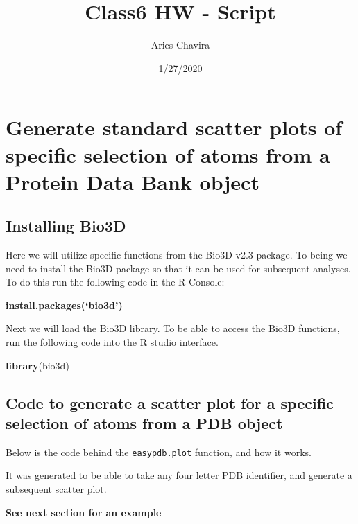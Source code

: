 \documentclass[]{article}
\title{Class6 HW - Script}
\author{Aries Chavira}
\date{1/27/2020}
\newenvironment{Shaded}{\begin{snugshade}}{\end{snugshade}}
\newcommand{\KeywordTok}[1]{\textcolor[rgb]{0.13,0.29,0.53}{\textbf{#1}}}
\newcommand{\NormalTok}[1]{#1}
\begin{document}
\maketitle

\section{Generate standard scatter plots of specific selection of atoms
from a Protein Data Bank
object}\label{generate-standard-scatter-plots-of-specific-selection-of-atoms-from-a-protein-data-bank-object}

\subsection{Installing Bio3D}\label{installing-bio3d}

Here we will utilize specific functions from the Bio3D v2.3 package. To
being we need to install the Bio3D package so that it can be used for
subsequent analyses. To do this run the following code in the R Console:

\textbf{install.packages(`bio3d')}

Next we will load the Bio3D library. To be able to access the Bio3D
functions, run the following code into the R studio interface.

\begin{Shaded}
\begin{Highlighting}[]
\KeywordTok{library}\NormalTok{(bio3d)}
\end{Highlighting}
\end{Shaded}

\subsection{Code to generate a scatter plot for a specific selection of
atoms from a PDB
object}\label{code-to-generate-a-scatter-plot-for-a-specific-selection-of-atoms-from-a-pdb-object}

Below is the code behind the \texttt{easypdb.plot} function, and how it
works.

It was generated to be able to take any four letter PDB identifier, and
generate a subsequent scatter plot.

\textbf{See next section for an example}
\end{document}
